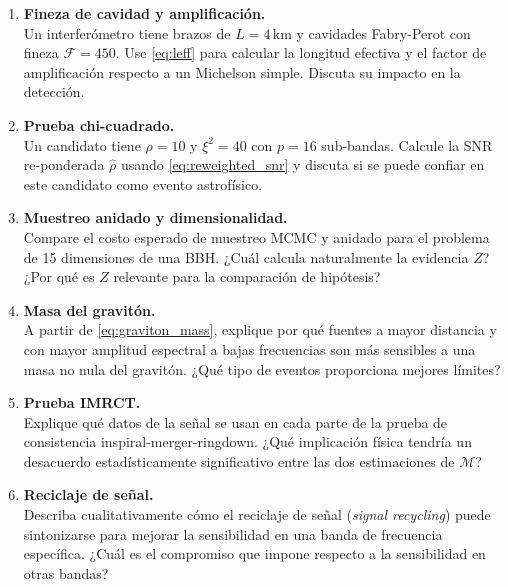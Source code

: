 \begin{enumerate}[leftmargin=2.2em, label=\textbf{P\arabic*.}]
\item \textbf{Fineza de cavidad y amplificación.} \\
Un interferómetro tiene brazos de $L=4\,\mathrm{km}$ y cavidades Fabry-Perot con fineza $\mathcal{F}=450$. Use \eqref{eq:leff} para calcular la longitud efectiva y el factor de amplificación respecto a un Michelson simple. Discuta su impacto en la detección.

\item \textbf{Prueba chi-cuadrado.} \\
Un candidato tiene $\rho=10$ y $\xi^2=40$ con $p=16$ sub-bandas. Calcule la SNR re-ponderada $\hat\rho$ usando \eqref{eq:reweighted_snr} y discuta si se puede confiar en este candidato como evento astrofísico.

\item \textbf{Muestreo anidado y dimensionalidad.} \\
Compare el costo esperado de muestreo MCMC y anidado para el problema de 15 dimensiones de una BBH. ¿Cuál calcula naturalmente la evidencia $Z$? ¿Por qué es $Z$ relevante para la comparación de hipótesis?

\item \textbf{Masa del gravitón.} \\
A partir de \eqref{eq:graviton_mass}, explique por qué fuentes a mayor distancia y con mayor amplitud espectral a bajas frecuencias son más sensibles a una masa no nula del gravitón. ¿Qué tipo de eventos proporciona mejores límites?

\item \textbf{Prueba IMRCT.} \\
Explique qué datos de la señal se usan en cada parte de la prueba de consistencia inspiral-merger-ringdown. ¿Qué implicación física tendría un desacuerdo estadísticamente significativo entre las dos estimaciones de $\mathcal{M}$?

\item \textbf{Reciclaje de señal.} \\
Describa cualitativamente cómo el reciclaje de señal (\emph{signal recycling}) puede sintonizarse para mejorar la sensibilidad en una banda de frecuencia específica. ¿Cuál es el compromiso que impone respecto a la sensibilidad en otras bandas?

\end{enumerate}
